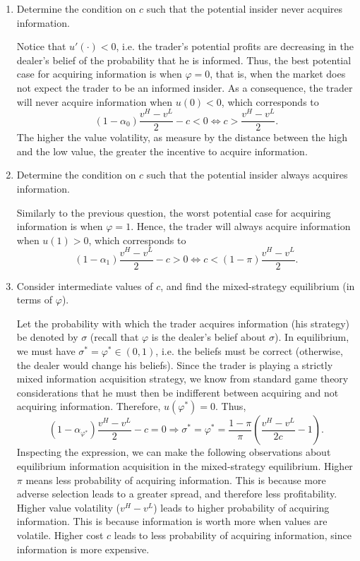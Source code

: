 \documentclass[11pt
, answers
]{exam}
\begin{document}
\begin{enumerate} [label=(\alph*). ]
\item Determine the condition on $c$ such that the potential insider never acquires information.

\begin{solution}
Notice that $u'(\cdot)<0$, i.e. the trader's potential profits are decreasing in the dealer's belief of the probability that he is informed. Thus, the best potential case for acquiring information is when $\varphi=0$, that is, when the market does not expect the trader to be an informed insider. As a consequence, the trader will never acquire information when $u(0) < 0$, which corresponds to
\[
(1-\alpha_0)\frac{v^H-v^L}{2}-c <0 \Leftrightarrow c > \frac{v^H-v^L}{2}.
\]
The higher the value volatility, as measure by the distance between the high and the low value, the greater the incentive to acquire information.
\end{solution}

\item Determine the condition on $c$ such that the potential insider always acquires information.

\begin{solution}
Similarly to the previous question, the worst potential case for acquiring information is when $\varphi=1$. Hence, the trader will always acquire information when $u(1) > 0$, which corresponds to
\[
(1-\alpha_1)\frac{v^H-v^L}{2}-c > 0 \Leftrightarrow c < (1-\pi) \frac{v^H-v^L}{2}.
\]

\end{solution}

\item Consider intermediate values of $c$, and find the mixed-strategy equilibrium (in terms of $\varphi$).

\begin{solution}
Let the probability with which the trader acquires information (his strategy) be denoted by $\sigma$ (recall that $\varphi$ is the dealer's belief about $\sigma$). In equilibrium, we must have $\sigma^*=\varphi^* \in (0,1)$, i.e. the beliefs must be correct (otherwise, the dealer would change his beliefs). Since the trader is playing a strictly mixed information acquisition strategy, we know from standard game theory considerations that he must then be indifferent between acquiring and not acquiring information. Therefore, $u(\varphi^*)=0$. Thus,
\[
(1-\alpha_{\varphi^*})\frac{v^H-v^L}{2}-c = 0 \Rightarrow \sigma^*=\varphi^* = \frac{1-\pi}{\pi} \left(\frac{v^H-v^L}{2c} -1 \right).
\]
Inspecting the expression, we can make the following observations about equilibrium information acquisition in the mixed-strategy equilibrium. Higher $\pi$ means less probability of acquiring information. This is because more adverse selection leads to a greater spread, and therefore less profitability. Higher value volatility ($v^H-v^L$) leads to higher probability of acquiring information. This is because information is worth more when values are volatile. Higher cost $c$ leads to less probability of acquiring information, since information is more expensive.


\end{solution}
\end{enumerate}
\end{document}
